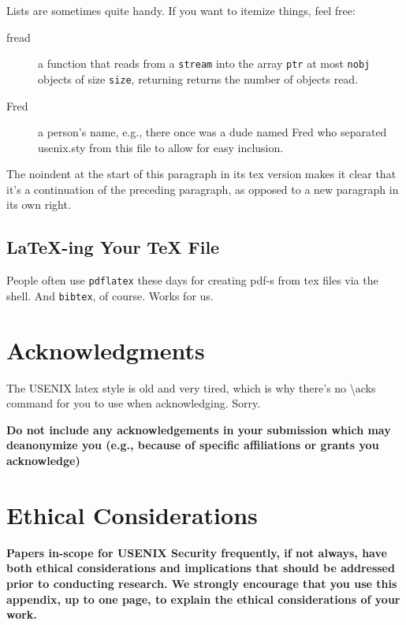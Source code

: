Lists are sometimes quite handy. If you want to itemize things, feel
free:

\begin{description}
  
\item[fread] a function that reads from a \texttt{stream} into the
  array \texttt{ptr} at most \texttt{nobj} objects of size
  \texttt{size}, returning returns the number of objects read.

\item[Fred] a person's name, e.g., there once was a dude named Fred
  who separated usenix.sty from this file to allow for easy
  inclusion.
\end{description}

\noindent
The noindent at the start of this paragraph in its tex version makes
it clear that it's a continuation of the preceding paragraph, as
opposed to a new paragraph in its own right.


\subsection{LaTeX-ing Your TeX File}

People often use \texttt{pdflatex} these days for creating pdf-s from
tex files via the shell. And \texttt{bibtex}, of course. Works for us.

\section*{Acknowledgments}

The USENIX latex style is old and very tired, which is why
there's no \textbackslash{}acks command for you to use when
acknowledging. Sorry.

\textbf{Do not include any acknowledgements in your submission which may deanonymize you (e.g., because of specific affiliations or grants you acknowledge)}

\cleardoublepage
\appendix
\section*{Ethical Considerations}
\textbf{Papers in-scope for USENIX Security frequently, if not always, have both ethical considerations and implications that should be addressed prior to conducting research. We strongly encourage that you use this appendix, up to one page, to explain the ethical considerations of your work.}
\cleardoublepage

